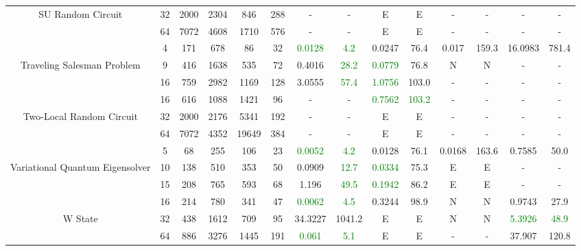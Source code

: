 \begin{table}[htb]
{\begin{tabular}{|c|c|c|c|c|c|c|c|c|c|c|c|c|c|}
SU Random Circuit & 
32 & 2000 & 2304 & 846 & 288
 & - & -
 & E & E
 & - & -
 & - & -
 \\
 & 
64 & 7072 & 4608 & 1710 & 576
 & - & -
 & E & E
 & - & -
 & - & -
 \\
\hline
 & 
4 & 171 & 678 & 86 & 32
 & \textcolor{green}{0.0128} & \textcolor{green}{4.2}
 & 0.0247 & 76.4
 & 0.017 & 159.3
 & 16.0983 & 781.4
 \\
Traveling Salesman Problem & 
9 & 416 & 1638 & 535 & 72
 & 0.4016 & \textcolor{green}{28.2}
 & \textcolor{green}{0.0779} & 76.8
 & N & N 
 & - & -
 \\
 & 
16 & 759 & 2982 & 1169 & 128
 & 3.0555 & \textcolor{green}{57.4}
 & \textcolor{green}{1.0756} & 103.0
 & - & -
 & - & -
 \\
\hline
 & 
16 & 616 & 1088 & 1421 & 96
 & - & -
 & \textcolor{green}{0.7562} & \textcolor{green}{103.2}
 & - & -
 & - & -
 \\
Two-Local Random Circuit & 
32 & 2000 & 2176 & 5341 & 192
 & - & -
 & E & E
 & - & -
 & - & -
 \\
 & 
64 & 7072 & 4352 & 19649 & 384
 & - & -
 & E & E
 & - & -
 & - & -
 \\
\hline
 & 
5 & 68 & 255 & 106 & 23
 & \textcolor{green}{0.0052} & \textcolor{green}{4.2}
 & 0.0128 & 76.1
 & 0.0168 & 163.6
 & 0.7585 & 50.0
 \\
Variational Quantum Eigensolver & 
10 & 138 & 510 & 353 & 50
 & 0.0909 & \textcolor{green}{12.7}
 & \textcolor{green}{0.0334} & 75.3
 & E & E
 & - & -
 \\
 & 
15 & 208 & 765 & 593 & 68
 & 1.196 & \textcolor{green}{49.5}
 & \textcolor{green}{0.1942} & 86.2
 & E & E
 & - & -
 \\
\hline
 & 
16 & 214 & 780 & 341 & 47
 & \textcolor{green}{0.0062} & \textcolor{green}{4.5}
 & 0.3244 & 98.9
 & N & N 
 & 0.9743 & 27.9
 \\
W State & 
32 & 438 & 1612 & 709 & 95
 & 34.3227 & 1041.2
 & E & E
 & N & N 
 & \textcolor{green}{5.3926} & \textcolor{green}{48.9}
 \\
 & 
64 & 886 & 3276 & 1445 & 191
 & \textcolor{green}{0.061} & \textcolor{green}{5.1}
 & E & E
 & - & -
 & 37.907 & 120.8
 \\
\hline
\end{tabular}}
\end{table}
